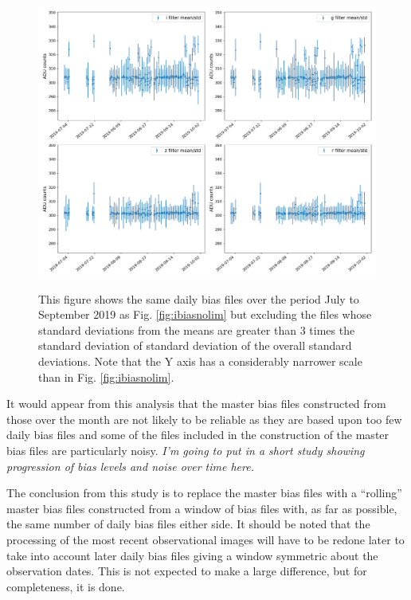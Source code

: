 \begin{figure}[!htbp]
\begin{center}
\includegraphics[scale=0.4]{images/ibiaslim3std.png}
\end{center}   
\caption{This figure shows the same daily bias files over the period July
to September 2019 as Fig. \ref{fig:ibiasnolim} but excluding the files whose
standard deviations from the means are greater than 3 times the standard
deviation of standard deviation of the overall standard deviations. Note that
the Y axis has a considerably narrower scale than in Fig. \ref{fig:ibiasnolim}.}
\protect\label{fig:bias3std}
\end{figure}

It would appear from this analysis that the master bias files constructed from
those over the month are not likely to be reliable as they are based upon too
few daily bias files and some of the files included in the construction of the
master bias files are particularly noisy. \textit{I'm going to put in a short study showing
progression of bias levels and noise over time here.}

The conclusion from this study is to replace the master bias files with a
``rolling'' master bias files constructed from a window of bias files with, as
far as possible, the same number of daily bias files either side. It should be
noted that the processing of the most recent observational images will have to
be redone later to take into account later daily bias files giving a window
symmetric about the observation dates. This is not expected to make a
large difference, but for completeness, it is done.

